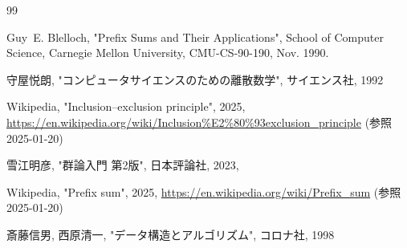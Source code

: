 \documentclass[12pt]{jsreport}
\theoremstyle{plain} %
\theoremstyle{definition}
\begin{document}
\begin{thebibliography}{99}

Guy~E. Blelloch, "Prefix Sums and Their Applications", School of Computer Science, Carnegie Mellon University, CMU-CS-90-190, Nov. 1990.

守屋悦朗, "コンピュータサイエンスのための離散数学", サイエンス社, 1992

Wikipedia, "{Inclusion–exclusion principle}", 2025, \url{https://en.wikipedia.org/wiki/Inclusion%E2%80%93exclusion_principle} (参照 2025-01-20)


雪江明彦, "群論入門 第2版", 日本評論社, 2023,

Wikipedia, "{Prefix sum}", 2025, \url{https://en.wikipedia.org/wiki/Prefix_sum} (参照 2025-01-20)

斎藤信男, 西原清一, "データ構造とアルゴリズム", コロナ社, 1998

\end{thebibliography}
\end{document}
